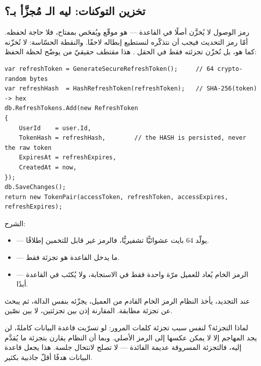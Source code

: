 \subsection{تخزين التوكنات: ليه الـ مُجزَّأ بـ؟}

رمز الوصول لا يُخزَّن أصلًا في القاعدة — هو موقّع ويُفحَص بمفتاح، فلا حاجة لحفظه.
أمّا رمز التحديث فيجب أن نتذكّره لنستطيع إبطاله لاحقًا. والنقطة الحسّاسة: لا نُخزّنه
كما هو، بل نُخزّن تجزئته فقط في الحقل . هذا مقتطف
حقيقيّ من  يوضّح لحظة الحفظ:

\begin{english}
\begin{lstlisting}[language={[Sharp]C}]
var refreshToken = GenerateSecureRefreshToken();     // 64 crypto-random bytes
var refreshHash  = HashRefreshToken(refreshToken);   // SHA-256(token) -> hex
db.RefreshTokens.Add(new RefreshToken
{
    UserId    = user.Id,
    TokenHash = refreshHash,        // the HASH is persisted, never the raw token
    ExpiresAt = refreshExpires,
    CreatedAt = now,
});
db.SaveChanges();
return new TokenPair(accessToken, refreshToken, accessExpires, refreshExpires);
\end{lstlisting}
\end{english}

الشرح:
\begin{itemize}
\item {} — يولّد 64 بايت عشوائيًّا تشفيريًّا، فالرمز
  غير قابل للتخمين إطلاقًا.
\item {} — ما يدخل القاعدة هو تجزئة  فقط.
\item {} — الرمز الخام يُعاد للعميل
  مرّة واحدة فقط في الاستجابة، ولا يُكتَب في القاعدة أبدًا.
\end{itemize}

عند التجديد، يأخذ النظام الرمز الخام القادم من العميل، يجزّئه بنفس الدالة، ثم يبحث
عن تجزئة مطابقة. المقارنة إذن بين تجزئتين، لا بين نصّين.

\begin{secnote}
لماذا التجزئة؟ لنفس سبب تجزئة كلمات المرور: لو تسرّبت قاعدة البيانات كاملةً، لن يجد
المهاجم إلا  لا يمكن عكسها إلى الرمز الأصلي. وبما أن النظام يقارن بتجزئة
ما يُقدَّم إليه، فالتجزئة المسروقة عديمة الفائدة — لا تصلح لانتحال جلسة. هذا يجعل
قاعدة البيانات هدفًا أقلّ جاذبية بكثير.
\end{secnote}

